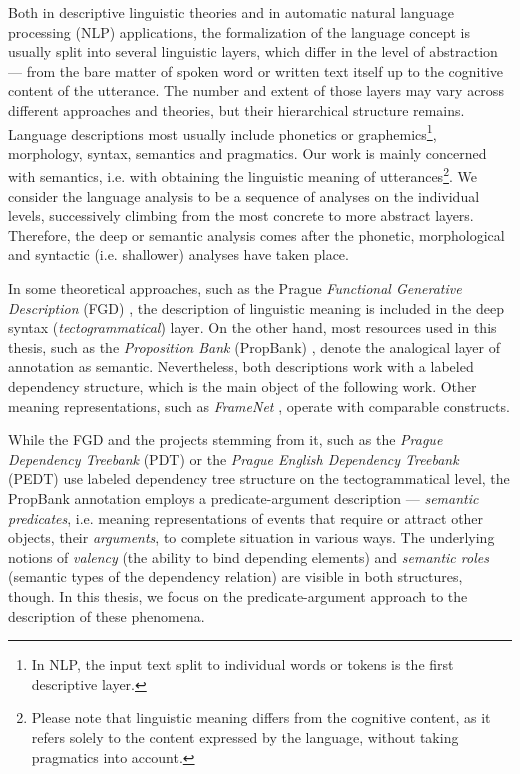 \documentclass[12pt,notitlepage]{report}
\begin{document}
Both in descriptive linguistic theories and in automatic natural language processing (NLP) applications, the formalization of the language concept is usually split into several linguistic layers, which differ in the level of abstraction --- from the bare matter of spoken word or written text itself up to the cognitive content of the utterance. The number and extent of those layers may vary across different approaches and theories, but their hierarchical structure remains. Language descriptions most usually include phonetics or graphemics\footnote{In NLP, the input text split to individual words or tokens is the first descriptive layer.}, morphology, syntax, semantics and pragmatics. Our work is mainly concerned with semantics, i.e. with obtaining the linguistic meaning \citep[p. 35ff.]{sgall86} of utterances\footnote{Please note that linguistic meaning differs from the cognitive content, as it refers solely to the content expressed by the language, without taking pragmatics into account.}. We consider the language analysis to be a sequence of analyses on the individual levels, successively climbing from the most concrete to more abstract layers. Therefore, the deep or semantic analysis comes after the phonetic, morphological and syntactic (i.e. shallower) analyses have taken place.

In some theoretical approaches, such as the Prague \emph{Functional Generative Description} (FGD) \citep{sgall86}, the description of linguistic meaning is included in the deep syntax (\emph{tectogrammatical}) layer. On the other hand, most resources used in this thesis, such as the \emph{Proposition Bank} (PropBank) \linebreak[4] \citep{palmer05}, denote the analogical layer of annotation as semantic. Nevertheless, both descriptions work with a labeled dependency structure, which is the main object of the following work. Other meaning representations, such as \emph{Frame\-Net} \citep{baker98}, operate with comparable constructs.

While the FGD and the projects stemming from it, such as the \emph{Prague Dependency Treebank} (PDT) \citep{hajic06} or the \emph{Prague English Dependency Treebank} (PEDT) \citep{cinkova09} use labeled dependency tree structure on the tectogrammatical level, the PropBank annotation \citep{kingsbury03} employs a predicate-argument description --- \emph{semantic predicates}, i.e. meaning representations of events that require or attract other objects, their \emph{arguments}, to complete situation in various ways. The underlying notions of \emph{valency} (the ability to bind depending elements) and \emph{semantic roles} \citep[cf. e.g.][p. 123]{gildea02,carreras05,sgall86} (semantic types of the dependency relation) are visible in both structures, though. In this thesis, we focus on the predicate-argument approach to the description of these phenomena.
\end{document}

